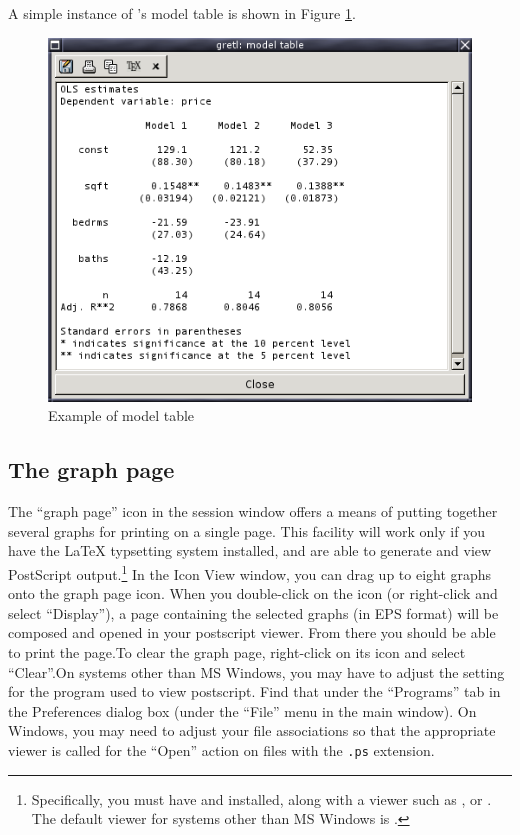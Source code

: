A simple instance of 's
	model table is shown in Figure \ref{fig-model-table}.
\begin{figure}[htbp]
\caption{Example of model table}
\label{fig-model-table}
\begin{center}
\includegraphics[scale=0.5]{figures/model_table}
\end{center}
\end{figure}


\subsection{The graph page}
\label{sect-graphpage}

The ``graph page'' icon in the session window
	offers a means of putting together several graphs for
	printing on a single page.  This facility will work only if
	you have the {\LaTeX} typsetting system installed, and are able
	to generate and view PostScript
	output.\footnote{Specifically, you must have
	     and
	     installed, along
	    with a viewer such as ,
	     or
	    . The default viewer
	    for systems other than MS Windows is
	    .}
      In the Icon View window, you can drag up to eight graphs
	onto the graph page icon.  When you double-click on the icon
	(or right-click and select ``Display''), a page
	containing the selected graphs (in EPS format) will be
	composed and opened in your postscript viewer.  From there you
	should be able to print the page.To clear the graph page, right-click on its icon and
	select ``Clear''.On systems other than MS Windows, you may have to adjust
	the setting for the program used to view postscript.  Find
	that under the ``Programs'' tab in the Preferences
	dialog box (under the ``File'' menu in the main
	window).  On Windows, you may need to adjust your file
	associations so that the appropriate viewer is called for the
	``Open'' action on files with the
	\verb+.ps+ extension.

